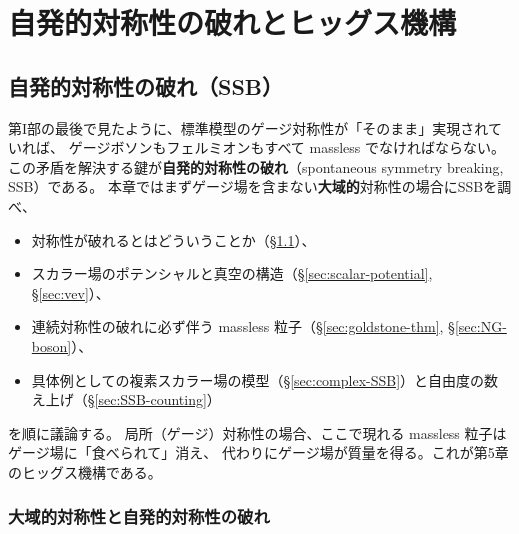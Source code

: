 \documentclass[uplatex,dvipdfmx,a4paper,11pt,openany]{jsbook}
\newcommand{\term}[2]{\textbf{#1}（#2）}
\numberwithin{equation}{chapter}
\theoremstyle{definition}
\theoremstyle{plain}
\theoremstyle{remark}
\begin{document}
\part{自発的対称性の破れとヒッグス機構}
\chapter{自発的対称性の破れ（SSB）}
\label{ch:SSB}
第I部の最後で見たように、標準模型のゲージ対称性が「そのまま」実現されていれば、
ゲージボソンもフェルミオンもすべて massless でなければならない。
この矛盾を解決する鍵が\term{自発的対称性の破れ}{spontaneous symmetry breaking, SSB}である。
本章ではまずゲージ場を含まない\textbf{大域的}対称性の場合にSSBを調べ、
\begin{itemize}
    \item 対称性が破れるとはどういうことか（\S\ref{sec:SSB-global}）、
    \item スカラー場のポテンシャルと真空の構造（\S\ref{sec:scalar-potential}, \S\ref{sec:vev}）、
    \item 連続対称性の破れに必ず伴う massless 粒子（\S\ref{sec:goldstone-thm}, \S\ref{sec:NG-boson}）、
    \item 具体例としての複素スカラー場の模型（\S\ref{sec:complex-SSB}）と自由度の数え上げ（\S\ref{sec:SSB-counting}）
\end{itemize}
を順に議論する。
局所（ゲージ）対称性の場合、ここで現れる massless 粒子はゲージ場に「食べられて」消え、
代わりにゲージ場が質量を得る。これが第5章のヒッグス機構である。
\section{大域的対称性と自発的対称性の破れ}
\label{sec:SSB-global}
\end{document}
